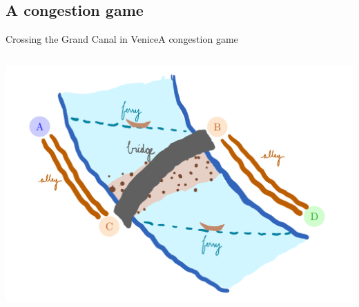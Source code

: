 \documentclass[aspectratio=169]{beamer}
\begin{document}
\subsection{A congestion game}

\begin{frame}{Crossing the Grand Canal in Venice}{A congestion game}

    \begin{columns}
        \includegraphics[width=\linewidth]{images/Venice_bridge_crossing_illustration.png}


\end{columns}
\end{frame}
\end{document}
